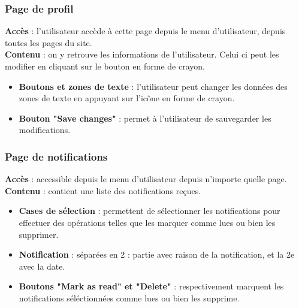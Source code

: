 \documentclass[../rapport.tex]{subfiles}
\begin{document}
\subsubsection{Page de profil}
\noindent \textbf{Accès} : l'utilisateur accède à cette page depuis le menu d'utilisateur, depuis toutes les pages du site. \\
\textbf{Contenu} : on y retrouve les informations de l'utilisateur. Celui ci peut les modifier en cliquant sur le bouton en forme de crayon.
\begin{itemize}
    \item \textbf{Boutons et zones de texte} : l'utilisateur peut changer les données des zones de texte en appuyant sur l'icône en forme de crayon.
    \item \textbf{Bouton "Save changes"} : permet à l'utilisateur de sauvegarder les modifications.
\end{itemize}


\subsubsection{Page de notifications}
\noindent \textbf{Accès} : accessible depuis le menu d'utilisateur depuis n'importe quelle page. \\
\textbf{Contenu} : contient une liste des notifications reçues.
\begin{itemize}
    \item \textbf{Cases de sélection} : permettent de sélectionner les notifications pour effectuer des opérations telles que les marquer comme lues ou bien les supprimer. 
    \item \textbf{Notification} : séparées en 2 : partie avec raison de la notification, et la 2e avec la date.
    \item \textbf{Boutons "Mark as read" et "Delete"} : respectivement marquent les notifications séléctionnées comme lues ou bien les supprime.
\end{itemize}
\end{document}
